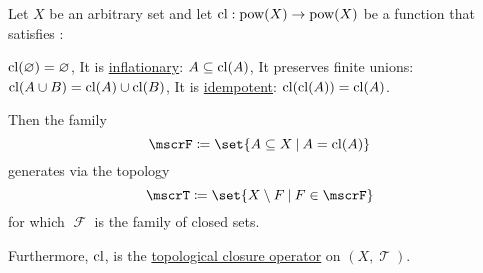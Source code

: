 \begin{proposition}\label{thm:topology_from_closure_operator}
  Let \( X \) be an arbitrary set and let \( \operatorname{cl}: \operatorname{pow}(X) \to \operatorname{pow}(X) \) be a function that satisfies :
  \begin{thmenum}
     \( \operatorname{cl}(\varnothing) = \varnothing \),
     It is \hyperref[def:inflationary_function]{inflationary}: \( A \subseteq \operatorname{cl}(A) \),
     It preserves finite unions: \( \operatorname{cl}(A \cup B) = \operatorname{cl}(A) \cup \operatorname{cl}(B) \),
     It is \hyperref[def:magma/idempotent]{idempotent}: \( \operatorname{cl}(\operatorname{cl}(A)) = \operatorname{cl}(A) \).
  \end{thmenum}

  Then the family
  \begin{equation*}
    \mscrF \coloneqq \set{ A \subseteq X \given A = \cl(A) }
  \end{equation*}
  generates via  the topology
  \begin{equation*}
    \mscrT \coloneqq \set{ X \setminus F \given F \in \mscrF }
  \end{equation*}
  for which \( \mscrF \) is the family of closed sets.

  Furthermore, \( \operatorname{cl} \), is the \hyperref[def:topological_closure_operator]{topological closure operator} on \( (X, \mscrT) \).
\end{proposition}
